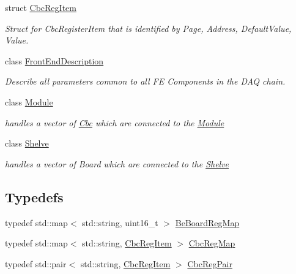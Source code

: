 \begin{CompactItemize}
struct \hyperlink{struct_ph2___hw_description_1_1_cbc_reg_item}{Cbc\-Reg\-Item}
\begin{CompactList}\small\item\em Struct for Cbc\-Register\-Item that is identified by Page, Address, Default\-Value, Value. \item\end{CompactList}\item 
class \hyperlink{class_ph2___hw_description_1_1_front_end_description}{Front\-End\-Description}
\begin{CompactList}\small\item\em Describe all parameters common to all FE Components in the DAQ chain. \item\end{CompactList}\item 
class \hyperlink{class_ph2___hw_description_1_1_module}{Module}
\begin{CompactList}\small\item\em handles a vector of \hyperlink{class_ph2___hw_description_1_1_cbc}{Cbc} which are connected to the \hyperlink{class_ph2___hw_description_1_1_module}{Module} \item\end{CompactList}\item 
class \hyperlink{class_ph2___hw_description_1_1_shelve}{Shelve}
\begin{CompactList}\small\item\em handles a vector of Board which are connected to the \hyperlink{class_ph2___hw_description_1_1_shelve}{Shelve} \item\end{CompactList}\end{CompactItemize}
\subsection*{Typedefs}
\begin{CompactItemize}
\item 
typedef std::map$<$ std::string, uint16\_\-t $>$ \hyperlink{namespace_ph2___hw_description_2e13fb82c8ed98154c60f9d0f8467d72}{Be\-Board\-Reg\-Map}
\item 
typedef std::map$<$ std::string, \hyperlink{struct_ph2___hw_description_1_1_cbc_reg_item}{Cbc\-Reg\-Item} $>$ \hyperlink{namespace_ph2___hw_description_9a23b373068f169aa67ca1d22c9a6001}{Cbc\-Reg\-Map}
\item 
typedef std::pair$<$ std::string, \hyperlink{struct_ph2___hw_description_1_1_cbc_reg_item}{Cbc\-Reg\-Item} $>$ \hyperlink{namespace_ph2___hw_description_78856413327152e693dceca249188d11}{Cbc\-Reg\-Pair}
\end{CompactItemize}


